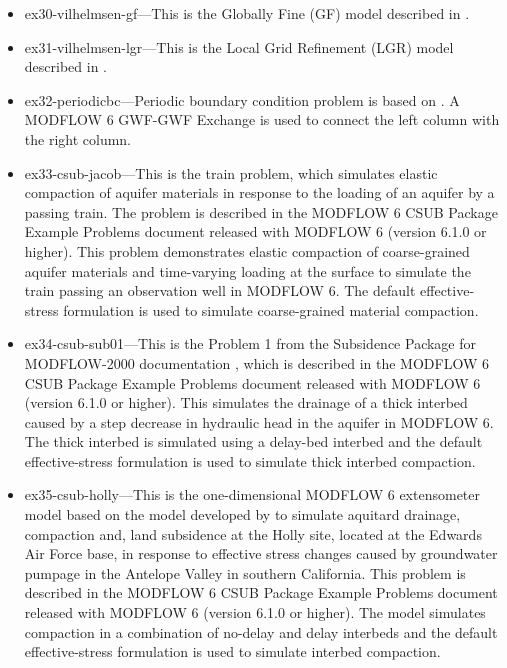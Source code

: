 \begin{itemize}
\item ex30-vilhelmsen-gf---This is the Globally Fine (GF) model described in \cite{vilhelmsen2012evaluation}.

\item ex31-vilhelmsen-lgr---This is the Local Grid Refinement (LGR) model described in \cite{vilhelmsen2012evaluation}.

\item ex32-periodicbc---Periodic boundary condition problem is based on \cite{laattoe2014spatial}. A MODFLOW 6 GWF-GWF Exchange is used to connect the left column with the right column.

\item ex33-csub-jacob---This is the \cite{jacob1939fluctuations} train problem, which simulates elastic compaction of aquifer materials in response to the loading of an aquifer by a passing train. The problem is described in the MODFLOW 6 CSUB Package Example Problems document released with MODFLOW 6 (version 6.1.0 or higher). This problem demonstrates elastic compaction of coarse-grained aquifer materials and time-varying loading at the surface to simulate the train passing an observation well in MODFLOW 6. The default effective-stress formulation is used to simulate coarse-grained material compaction.

\item ex34-csub-sub01---This is the Problem 1 from the Subsidence Package for MODFLOW-2000 documentation \citep{hoffmann2003modflow}, which is described in the MODFLOW 6 CSUB Package Example Problems document released with MODFLOW 6 (version 6.1.0 or higher).  This simulates the drainage of a thick interbed caused by a step decrease in hydraulic head in the aquifer in MODFLOW 6. The thick interbed is simulated using a delay-bed interbed and the default effective-stress formulation is used to simulate thick interbed compaction.

\item ex35-csub-holly---This is the one-dimensional MODFLOW 6 extensometer model based on the model developed by \cite{sneed2008} to simulate aquitard drainage, compaction and, land subsidence at the Holly site, located at the Edwards Air Force base, in response to effective stress changes caused by groundwater pumpage in the Antelope Valley in southern California. This problem is described in the MODFLOW 6 CSUB Package Example Problems document released with MODFLOW 6 (version 6.1.0 or higher). The model simulates compaction in a combination of no-delay and delay interbeds and the default effective-stress formulation is used to simulate interbed compaction.


\end{itemize}
